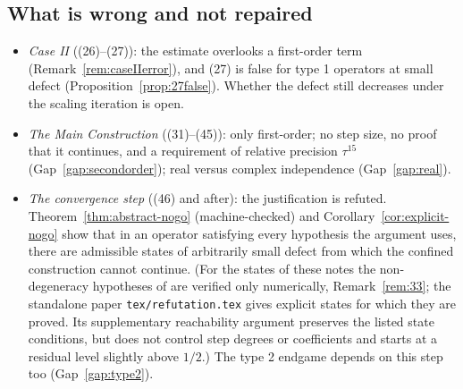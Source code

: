 \subsection*{What is wrong and not repaired}
\begin{itemize}[leftmargin=2em]
\item \emph{Case II} ((26)--(27)): the estimate overlooks a first-order term
(Remark~\ref{rem:caseIIerror}), and (27) is false for type 1 operators at small defect
(Proposition~\ref{prop:27false}). Whether the defect still decreases under the scaling
iteration is open.
\item \emph{The Main Construction} ((31)--(45)): only first-order; no step size, no proof that
it continues, and a requirement of relative precision $\tau^{15}$ (Gap~\ref{gap:secondorder});
real versus complex independence (Gap~\ref{gap:real}).
\item \emph{The convergence step} ((46) and after): the justification is refuted.
Theorem~\ref{thm:abstract-nogo} (machine-checked) and Corollary~\ref{cor:explicit-nogo} show
that in an operator satisfying every hypothesis the argument uses, there are admissible states
of arbitrarily small defect from which the confined construction cannot continue. (For the states of these notes the non-degeneracy hypotheses of \paper{} are verified only
numerically, Remark~\ref{rem:33}; the standalone paper \texttt{tex/refutation.tex} gives
explicit states for which they are proved. Its supplementary reachability argument preserves
the listed state conditions, but does not control step degrees or coefficients and starts at
a residual level slightly above $1/2$.) The type 2 endgame depends on this step too
(Gap~\ref{gap:type2}).
\end{itemize}


